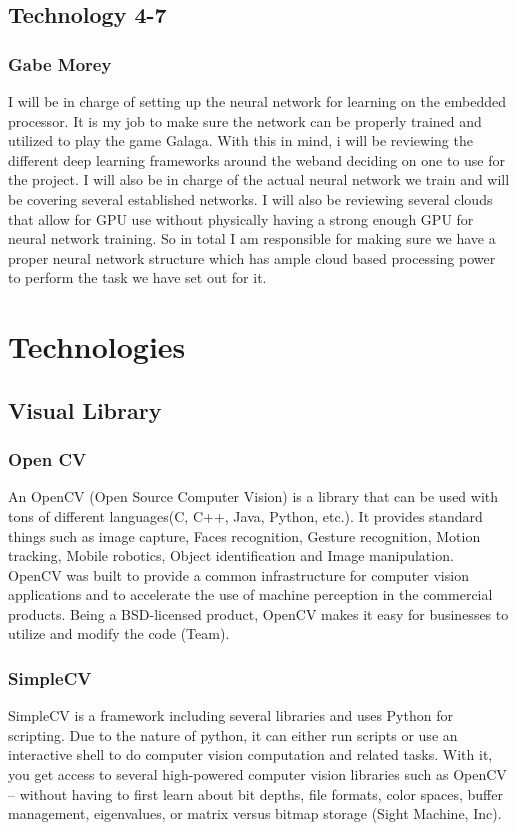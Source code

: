 \documentclass{scrreprt}
\begin{document}
\section{Technology 4-7}
\subsection{Gabe Morey}
I will be in charge of setting up the neural network for learning on the embedded processor. 
It is my job to make sure the network can be properly trained and utilized to play the game Galaga.
With this in mind, i will be reviewing the different deep learning frameworks around the weband deciding on one to use for the project. 
I will also be in charge of the actual neural network we train and will be covering several established networks. 
I will also be reviewing several clouds that allow for GPU use without physically having a strong enough GPU for neural network training. So in total I am responsible for making sure we have a proper neural network structure which has ample cloud based processing power to perform the task we have set out for it.

\chapter{Technologies}
\section{Visual Library}
\subsection{Open CV}
An OpenCV (Open Source Computer Vision) is a library that can be used with tons of different languages(C, C++, Java, Python, etc.).
 It provides standard things such as image capture, Faces recognition, Gesture recognition, Motion tracking, Mobile robotics, Object identification and Image manipulation.
 OpenCV was built to provide a common infrastructure for computer vision applications and to accelerate the use of machine perception in the commercial products.
 Being a BSD-licensed product, OpenCV makes it easy for businesses to utilize and modify the code (Team).
\subsection{SimpleCV}
SimpleCV is a framework including several libraries and uses Python for scripting.
Due to the nature of python, it can either run scripts or use an interactive shell to do computer vision computation and related tasks.
With it, you get access to several high-powered computer vision libraries such as OpenCV – without having to first learn about bit depths,
file formats, color spaces, buffer management, eigenvalues, or matrix versus bitmap storage (Sight Machine, Inc).
\end{document}
